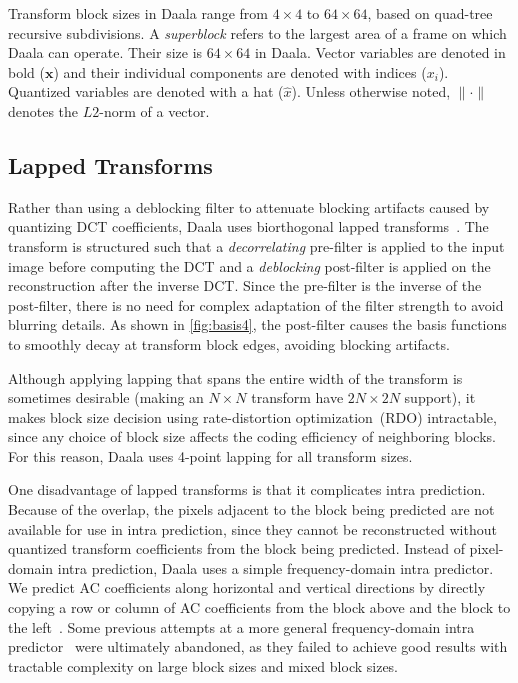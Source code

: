 \documentclass[english,conference,10pt]{IEEEtran}
\begin{document}
Transform block sizes in Daala range from $4 \times 4$
to $64 \times 64$, based on quad-tree recursive subdivisions. A
\textit{superblock} refers to the largest area of a frame on which Daala
can operate. Their size is $64\times 64$ in Daala. Vector variables are
denoted in bold ($\mathbf{x}$) and their individual components are denoted
with indices ($x_i$). Quantized variables are denoted with a hat ($\hat{x}$).
Unless otherwise noted, $\|\cdot\|$ denotes the $L2$-norm of a vector.

\subsection{Lapped Transforms}

Rather than using a deblocking filter to attenuate blocking artifacts caused
by quantizing DCT coefficients, Daala uses biorthogonal lapped
transforms~\cite{MalvarS89,Tran2003}. The transform is structured such that
a \textit{decorrelating} pre-filter is applied to the input image before computing
the DCT and a \textit{deblocking} post-filter is applied on the reconstruction
after the inverse DCT\@. Since the pre-filter is the inverse of the post-filter,
there is no need for complex adaptation of the filter strength to avoid blurring
details. As shown in \cref{fig:basis4}, the post-filter causes the basis functions
to smoothly decay at transform block edges, avoiding blocking artifacts.

Although applying lapping that spans the entire width of the transform is
sometimes desirable (making an $N \times N$ transform have $2N \times 2N$ support),
it makes block size decision using rate-distortion optimization~(RDO) intractable,
since any choice of block size affects the coding efficiency of neighboring blocks. For
this reason, Daala uses 4-point lapping for all transform sizes.

One disadvantage of lapped transforms is that it complicates intra prediction.
Because of the overlap, the pixels adjacent to the block being predicted are not
available for use in intra prediction, since they cannot be reconstructed
without quantized transform coefficients from the block being predicted.
Instead of pixel-domain intra prediction, Daala uses a simple
frequency-domain intra predictor. We predict AC coefficients along horizontal
and vertical directions by directly copying a row or column of AC
coefficients from the block above and the block to the left~\cite{EggePCS}.
Some previous attempts at a more general
frequency-domain intra predictor~\cite{fdintra-demo} were ultimately abandoned,
as they failed to achieve good results with tractable complexity on large block
sizes and mixed block sizes.
\end{document}

